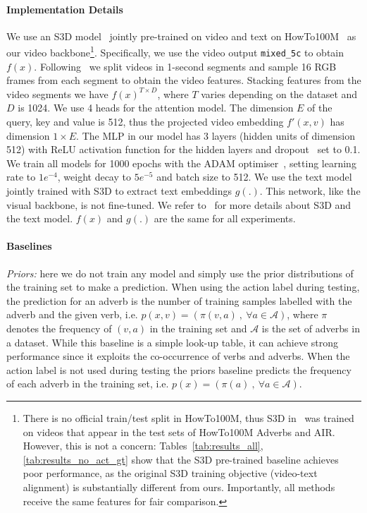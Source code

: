 \documentclass[10pt,twocolumn,letterpaper]{article}
\newcommand{\fparagraph}[1]{\paragraph{#1}}
\begin{document}
\fparagraph{Implementation Details}
We use an S3D model~\cite{xie2018rethinking,miech19endtoend} jointly pre-trained on video and text on HowTo100M~\cite{miech19howto100m} as our video backbone\footnote{There is no official train/test split in HowTo100M, thus S3D in~\cite{miech19endtoend} was trained on videos that appear in the test sets of HowTo100M Adverbs and AIR. However, this is not a concern: Tables~\ref{tab:results_all},  \ref{tab:results_no_act_gt} show that the S3D pre-trained baseline achieves poor performance, as the original S3D training objective (video-text alignment) is substantially different from ours. Importantly, all methods
receive the same features for fair comparison.}. Specifically, we use the video output \texttt{mixed\_5c} to obtain $f(x)$. Following~\cite{doughty2020action} we split videos in 1-second segments and sample 16 RGB frames from each segment to obtain the video features. 
Stacking features from the video segments we have $f(x)^{T \times D}$, where $T$ varies depending on the dataset and $D$ is 1024. We use 4 heads for the attention model. 
The dimension $E$ of the query, key and value is 512, thus the projected video embedding $f'(x, v)$ has dimension $1 \times E$. 
The MLP in our model has 3 layers (hidden units of dimension 512) with ReLU activation function for the hidden layers and dropout~\cite{srivastava2014dropout} set to 0.1. 
We train all models for 1000 epochs with the ADAM optimiser~\cite{kingma2015adam}, setting learning rate to $1e^{-4}$, weight decay to $5e^{-5}$ and batch size to 512. We use the text model jointly trained with S3D to extract text embeddings $g(.)$. This network, like the visual backbone, is not fine-tuned. We refer to~\cite{miech19endtoend} for more details about S3D and the text model. $f(x)$ and $g(.)$ are the same for all experiments.

\vspace{-12pt}

\fparagraph{Baselines} \textit{Priors:} here we do not train any model and simply use the prior distributions of the training set to make a prediction. When using the action label during testing, the prediction for an adverb is the number of training samples labelled with the adverb and the given verb, i.e. $p(x, v) = (\pi(v, a) \ , \ \forall a \in \mathcal{A})$, where $\pi$ denotes the frequency of $(v, a)$ in the training set and $\mathcal{A}$ is the set of adverbs in a dataset. While this baseline is a simple look-up table, it can achieve strong performance since it exploits the co-occurrence of verbs and adverbs. When the action label is not used during testing the priors baseline predicts the frequency of each adverb in the training set, i.e. $p(x) = (\pi(a) \ , \ \forall a \in \mathcal{A})$.
\end{document}
